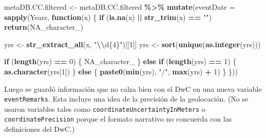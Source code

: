 \documentclass[sn-apa,pdflatex]{sn-jnl}
\newenvironment{Shaded}{\begin{snugshade}}{\end{snugshade}}
\newcommand{\AttributeTok}[1]{\textcolor[rgb]{0.13,0.29,0.53}{#1}}
\newcommand{\ConstantTok}[1]{\textcolor[rgb]{0.56,0.35,0.01}{#1}}
\newcommand{\ControlFlowTok}[1]{\textcolor[rgb]{0.13,0.29,0.53}{\textbf{#1}}}
\newcommand{\DecValTok}[1]{\textcolor[rgb]{0.00,0.00,0.81}{#1}}
\newcommand{\FunctionTok}[1]{\textcolor[rgb]{0.13,0.29,0.53}{\textbf{#1}}}
\newcommand{\NormalTok}[1]{#1}
\newcommand{\OtherTok}[1]{\textcolor[rgb]{0.56,0.35,0.01}{#1}}
\newcommand{\SpecialCharTok}[1]{\textcolor[rgb]{0.81,0.36,0.00}{\textbf{#1}}}
\newcommand{\StringTok}[1]{\textcolor[rgb]{0.31,0.60,0.02}{#1}}
\begin{document}
\begin{Shaded}
\begin{Highlighting}[]
\NormalTok{metaDB.CC.filtered }\OtherTok{\textless{}{-}}\NormalTok{ metaDB.CC.filtered }\SpecialCharTok{\%\textgreater{}\%}
    \FunctionTok{mutate}\NormalTok{(}\AttributeTok{eventDate =} \FunctionTok{sapply}\NormalTok{(Years, }\ControlFlowTok{function}\NormalTok{(x) \{}
        \ControlFlowTok{if}\NormalTok{ (}\FunctionTok{is.na}\NormalTok{(x) }\SpecialCharTok{||} \FunctionTok{str\_trim}\NormalTok{(x) }\SpecialCharTok{==} \StringTok{""}\NormalTok{)}
            \FunctionTok{return}\NormalTok{(}\ConstantTok{NA\_character\_}\NormalTok{)}

\NormalTok{        yrs }\OtherTok{\textless{}{-}} \FunctionTok{str\_extract\_all}\NormalTok{(x, }\StringTok{"}\SpecialCharTok{\textbackslash{}\textbackslash{}}\StringTok{d\{4\}"}\NormalTok{)[[}\DecValTok{1}\NormalTok{]]}
\NormalTok{        yrs }\OtherTok{\textless{}{-}} \FunctionTok{sort}\NormalTok{(}\FunctionTok{unique}\NormalTok{(}\FunctionTok{as.integer}\NormalTok{(yrs)))}

        \ControlFlowTok{if}\NormalTok{ (}\FunctionTok{length}\NormalTok{(yrs) }\SpecialCharTok{==} \DecValTok{0}\NormalTok{) \{}
            \ConstantTok{NA\_character\_}
\NormalTok{        \} }\ControlFlowTok{else} \ControlFlowTok{if}\NormalTok{ (}\FunctionTok{length}\NormalTok{(yrs) }\SpecialCharTok{==} \DecValTok{1}\NormalTok{) \{}
            \FunctionTok{as.character}\NormalTok{(yrs[}\DecValTok{1}\NormalTok{])}
\NormalTok{        \} }\ControlFlowTok{else}\NormalTok{ \{}
            \FunctionTok{paste0}\NormalTok{(}\FunctionTok{min}\NormalTok{(yrs), }\StringTok{"/"}\NormalTok{, }\FunctionTok{max}\NormalTok{(yrs) }\SpecialCharTok{+} \DecValTok{1}\NormalTok{)}
\NormalTok{        \}}
\NormalTok{    \}))}
\end{Highlighting}
\end{Shaded}

Luego se guardó información que no calza bien con el DwC en una nueva
variable \texttt{eventRemarks}. Esta incluye una idea de la precisión de
la geolocación. (No se usaron variables tales como
\texttt{coordinateUncertaintyInMeters} o \texttt{coordinatePrecision}
porque el formato narrativo no concuerda con las definiciones del DwC.)

\begin{Shaded}
\end{Shaded}
\end{document}
